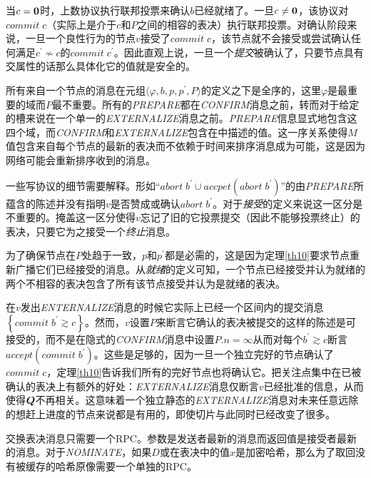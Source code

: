 当$c={\bm 0}$时，上数协议执行联邦投票来确认$b$已经就绪了。一旦$c\neq {\bm 0}$，该协议对$commit\;c$（实际上是介于$c$和$P$之间的相容的表决）执行联邦投票。对确认阶段来说，一旦一个良性行为的节点$v$接受了$commit\;c$，该节点就不会接受或尝试确认任何满足$c^{\prime}\not\sim c$的$commit\;c^{\prime}$。因此直观上说，一旦一个\textit{提交}被确认了，只要节点具有{\quorum}交属性的话那么具体化它的值就是安全的。

所有来自一个节点的消息在元组$\langle \varphi,b,p,p^{\prime},P\rangle$的定义之下是全序的，这里$\varphi$是最重要的域而$P$最不重要。所有的\textsl{PREPARE}都在\textsl{CONFIRM}消息之前，转而对于给定的槽来说在一个单一的\textsl{EXTERNALIZE}消息之前。\textsl{PREPARE}信息显式地包含这四个域，而\textsl{CONFIRM}和\textsl{EXTERNALIZE}包含在中描述的值。这一序关系使得$M$值包含来自每个节点的最新的表决而不依赖于时间来排序消息成为可能，这是因为网络可能会重新排序收到的消息。

一些写协议的细节需要解释。形如``$abort\;b^{\prime}\cup accpet(abort\;b^{\prime})$''的由\textsl{PREPARE}所蕴含的陈述并没有指明$v$是否赞成或确认$abort\;b^{\prime}$。对于\textit{接受}的定义来说这一区分是不重要的。掩盖这一区分使得$v$忘记了旧的它投票提交（因此不能够投票终止）的表决，只要它为之接受一个\textit{终止}消息。

为了确保节点在$P$处趋于一致，$p$和$p^{\prime}$都是必需的，这是因为定理\ref{th10}要求节点重新广播它们已经接受的消息。从\textit{就绪}的定义可知，一个节点已经接受并认为就绪的两个不相容的表决包含了所有该节点接受并认为是就绪的表决。

在$v$发出\textsl{ENTERNALIZE}消息的时候它实际上已经一个区间内的提交消息$\left\{commit \; b^{\prime}\gtrsim c\right\}$。然而，$v$设置$P$来断言它确认的表决被提交的这样的陈述是可接受的，而不是在隐式的\textsl{CONFIRM}消息中设置$P.n=\infty$从而对每个$b^{\prime}\gtrsim c$断言$accept(commit\;b^{\prime})$。这些是足够的，因为一旦一个独立完好的节点确认了$commit\;c$，定理\ref{th10}告诉我们所有的完好节点也将确认它。把关注点集中在已被确认的表决上有额外的好处：\textsl{EXTERNALIZE}消息仅断言$v$已经批准的信息，从而使得${\bm Q}$不再相关。这意味着一个独立静态的\textsl{EXTERNALIZE}消息对未来任意远除的想赶上进度的节点来说都是有用的，即使{\quorum}切片与此同时已经改变了很多。

交换表决消息只需要一个RPC。参数是发送者最新的消息而返回值是接受者最新的消息。对于\textsl{NOMINATE}，如果$D$或在表决中的值$x$是加密哈希，那么为了取回没有被缓存的哈希原像需要一个单独的RPC。